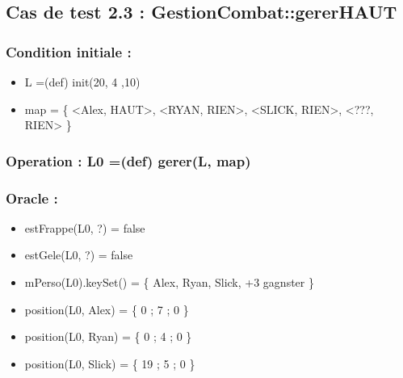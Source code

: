 \documentclass[11pt]{article}
\begin{document}
\subsection{Cas de test 2.3 : GestionCombat::gererHAUT}
\label{sec-1.4}

\subsubsection{Condition initiale :}
\label{sec-1.4.1}

\begin{itemize}

\item L =(def) init(20, 4 ,10)\\
\label{sec-1.4.1.1}


\item map = \{ <Alex, HAUT>, <RYAN, RIEN>, <SLICK, RIEN>, <???, RIEN> \}\\
\label{sec-1.4.1.2}

\end{itemize} %
\subsubsection{Operation : L0 =(def) gerer(L, map)}
\label{sec-1.4.2}

\subsubsection{Oracle :}
\label{sec-1.4.3}

\begin{itemize}

\item estFrappe(L0, ?) = false\\
\label{sec-1.4.3.1}


\item estGele(L0, ?) = false\\
\label{sec-1.4.3.2}


\item mPerso(L0).keySet() = \{ Alex, Ryan, Slick, +3 gagnster \}\\
\label{sec-1.4.3.3}


\item position(L0, Alex) = \{ 0 ; 7 ; 0 \}\\
\label{sec-1.4.3.4}


\item position(L0, Ryan) = \{ 0 ; 4 ; 0 \}\\
\label{sec-1.4.3.5}


\item position(L0, Slick) = \{ 19 ; 5 ; 0 \}\\
\label{sec-1.4.3.6}


\end{itemize} %
\end{document}
